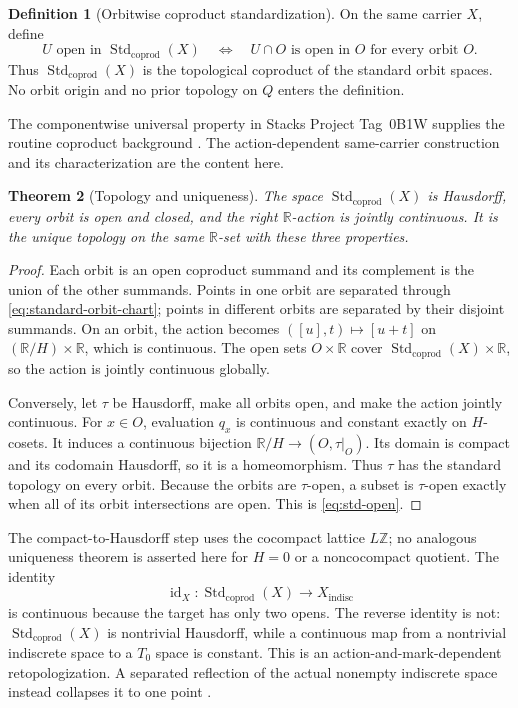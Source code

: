 \documentclass[11pt]{article}
\newtheorem{theorem}{Theorem}[section]
\theoremstyle{definition}
\newtheorem{definition}[theorem]{Definition}
\newcommand{\R}{\mathbb R}
\newcommand{\Z}{\mathbb Z}
\newcommand{\Std}{\operatorname{Std}_{\mathrm{coprod}}}
\newcommand{\id}{\operatorname{id}}
\begin{document}
\begin{definition}[Orbitwise coproduct standardization]
\label{def:std}
On the same carrier $X$, define
\begin{equation}
\label{eq:std-open}
 U\text{ open in }\Std(X)
 \quad\Longleftrightarrow\quad
 U\cap O\text{ is open in }O\text{ for every orbit }O.
\end{equation}
Thus $\Std(X)$ is the topological coproduct of the standard orbit spaces.
No orbit origin and no prior topology on $Q$ enters the definition.
\end{definition}

The componentwise universal property in Stacks Project Tag~0B1W supplies
the routine coproduct background \cite{Stacks0B1W}.  The action-dependent
same-carrier construction and its characterization are the content here.

\begin{theorem}[Topology and uniqueness]
\label{thm:std-topology}
The space $\Std(X)$ is Hausdorff, every orbit is open and closed, and the
right $\R$-action is jointly continuous.  It is the unique topology on the
same $\R$-set with these three properties.
\end{theorem}

\begin{proof}
Each orbit is an open coproduct summand and its complement is the union of
the other summands.  Points in one orbit are separated through
\cref{eq:standard-orbit-chart}; points in different orbits are separated by
their disjoint summands.  On an orbit, the action becomes
$([u],t)\mapsto[u+t]$ on $(\R/H)\times\R$, which is continuous.  The open
sets $O\times\R$ cover $\Std(X)\times\R$, so the action is jointly
continuous globally.

Conversely, let $\tau$ be Hausdorff, make all orbits open, and make the
action jointly continuous.  For $x\in O$, evaluation $q_x$ is continuous
and constant exactly on $H$-cosets.  It induces a continuous bijection
$\R/H\to(O,\tau|_O)$.  Its domain is compact and its codomain Hausdorff, so
it is a homeomorphism.  Thus $\tau$ has the standard topology on every
orbit.  Because the orbits are $\tau$-open, a subset is $\tau$-open exactly
when all of its orbit intersections are open.  This is
\cref{eq:std-open}.
\end{proof}

The compact-to-Hausdorff step uses the cocompact lattice $L\Z$; no analogous
uniqueness theorem is asserted here for $H=0$ or a noncocompact quotient.
The identity
\begin{equation}
\label{eq:identity-direction}
 \id_X:\Std(X)\longrightarrow X_{\mathrm{indisc}}
\end{equation}
is continuous because the target has only two opens.  The reverse identity
is not: $\Std(X)$ is nontrivial Hausdorff, while a continuous map from a
nontrivial indiscrete space to a $T_0$ space is constant.  This is an
action-and-mark-dependent retopologization.  A separated reflection of the
actual nonempty indiscrete space instead collapses it to one point
\cite{Wang2026SeparatedReflections}.
\end{document}
